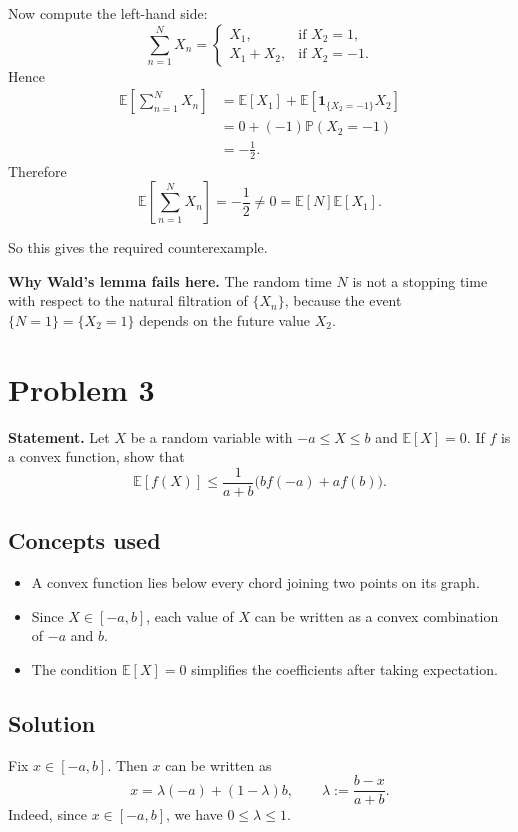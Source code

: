 \documentclass[11pt]{article}
\newcommand{\EE}{\mathbb{E}}
\newcommand{\PP}{\mathbb{P}}
\begin{document}
Now compute the left-hand side:
\[
\sum_{n=1}^N X_n
=
\begin{cases}
X_1, & \text{if } X_2=1,\\
X_1+X_2, & \text{if } X_2=-1.
\end{cases}
\]
Hence
\begin{align*}
\EE\left[\sum_{n=1}^N X_n\right]
&= \EE[X_1] + \EE[\mathbf{1}_{\{X_2=-1\}}X_2] \\
&= 0 + \left(-1\right)\PP(X_2=-1) \\
&= -\frac12.
\end{align*}
Therefore
\[
\EE\left[\sum_{n=1}^N X_n\right] = -\frac12 \ne 0 = \EE[N]\EE[X_1].
\]

So this gives the required counterexample.

\medskip
\noindent
\textbf{Why Wald's lemma fails here.} The random time $N$ is not a stopping time with respect
to the natural filtration of $\{X_n\}$, because the event $\{N=1\}=\{X_2=1\}$ depends on the
future value $X_2$.

\section*{Problem 3}

\textbf{Statement.} Let $X$ be a random variable with $-a \le X \le b$ and $\EE[X]=0$. If
$f$ is a convex function, show that
\[
\EE[f(X)] \le \frac{1}{a+b}\bigl(bf(-a)+af(b)\bigr).
\]

\subsection*{Concepts used}

\begin{itemize}
\item A convex function lies below every chord joining two points on its graph.
\item Since $X \in [-a,b]$, each value of $X$ can be written as a convex combination of $-a$
      and $b$.
\item The condition $\EE[X]=0$ simplifies the coefficients after taking expectation.
\end{itemize}

\subsection*{Solution}

Fix $x \in [-a,b]$. Then $x$ can be written as
\[
x = \lambda(-a) + (1-\lambda)b,
\qquad
\lambda := \frac{b-x}{a+b}.
\]
Indeed, since $x \in [-a,b]$, we have $0 \le \lambda \le 1$.
\end{document}
